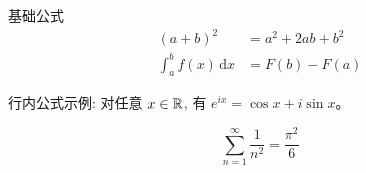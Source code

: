 
\begin{frame}{基础公式}
  \begin{align}
    (a + b)^2 &= a^2 + 2ab + b^2 \\
    \int_a^b f(x)\,\mathrm{d}x &= F(b) - F(a)
  \end{align}

  \pause

  行内公式示例: 对任意 $x \in \mathbb{R}$, 有 $e^{ix} = \cos x + i\sin x$。

  \begin{equation}
    \sum_{n=1}^{\infty} \frac{1}{n^2} = \frac{\pi^2}{6}
  \end{equation}
\end{frame}
